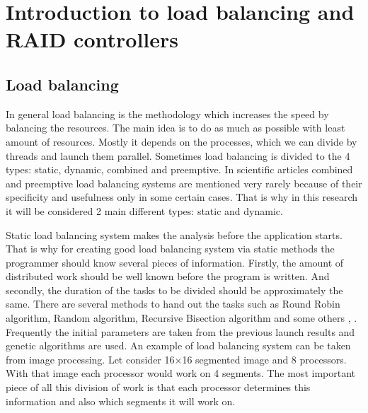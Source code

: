 \chapter{Introduction to load balancing and RAID controllers}
\label{chap2:title}


\section{Load balancing}

In general load balancing is the methodology which increases the speed by balancing the resources. The main idea is to do as much as possible with least amount of resources. Mostly it depends on the processes, which we can divide by threads and launch them parallel. Sometimes load balancing is divided to the 4 types: static, dynamic, combined and preemptive. In scientific articles combined and preemptive load balancing systems are mentioned very rarely because of their specificity and usefulness only in some certain cases. That is why in this research it will be considered 2 main different types: static and dynamic.


Static load balancing system makes the analysis before the application starts. That is why for creating good load balancing system via static methods the programmer should know several pieces of information. Firstly, the amount of distributed work should be well known before the program is written. And secondly, the duration of the tasks to be divided should be approximately the same. There are several methods to hand out the tasks such as Round Robin algorithm, Random algorithm, Recursive Bisection algorithm and some others \cite{oper_sys_conc}, \cite{perf_dlba}. Frequently the initial parameters are taken from the previous launch results and genetic algorithms are used. An example of load balancing system can be taken from image processing. Let consider 16$\times$16 segmented image and 8 processors. With that image each processor would work on 4 segments. The most important piece of all this division of work is that each processor determines this information and also which segments it will work on.



